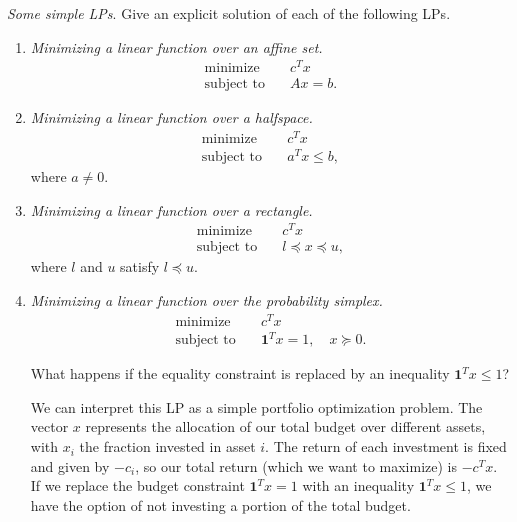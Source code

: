 \documentclass[11pt,letter,notitlepage]{article}
\theoremstyle{definition}
\begin{document}
\newpage

\begin{exercise}
\textit{Some simple LPs}. Give an explicit solution of each of the following LPs.

\begin{enumerate}[label=(\alph*)]
    \item \textit{Minimizing a linear function over an affine set.}
    \[
    \begin{aligned}
    \text{minimize} \quad & c^T x \\
    \text{subject to} \quad & Ax=b.
    \end{aligned}
    \]

    \item \textit{Minimizing a linear function over a halfspace.}
    \[
    \begin{aligned}
    \text{minimize} \quad & c^T x \\
    \text{subject to} \quad & a^T x \le b,
    \end{aligned}
    \]
    where $a \ne 0$.

    \item \textit{Minimizing a linear function over a rectangle.}
    \[
    \begin{aligned}
    \text{minimize} \quad & c^T x \\
    \text{subject to} \quad & l \preceq x \preceq u,
    \end{aligned}
    \]
    where $l$ and $u$ satisfy $l \preceq u$.

    \item \textit{Minimizing a linear function over the probability simplex.}
    \[
    \begin{aligned}
    \text{minimize} \quad & c^T x \\
    \text{subject to} \quad & \mathbf{1}^T x = 1,\quad x \succeq 0.
    \end{aligned}
    \]

    What happens if the equality constraint is replaced by an inequality
    $\mathbf{1}^T x \le 1$?

    We can interpret this LP as a simple portfolio optimization problem.
    The vector $x$ represents the allocation of our total budget over different assets,
    with $x_i$ the fraction invested in asset $i$. The return of each investment is fixed
    and given by $-c_i$, so our total return (which we want to maximize) is $-c^T x$.
    If we replace the budget constraint $\mathbf{1}^T x = 1$ with an inequality
    $\mathbf{1}^T x \le 1$, we have the option of not investing a portion of the total budget.
\end{enumerate}
\end{exercise}
\end{document}
